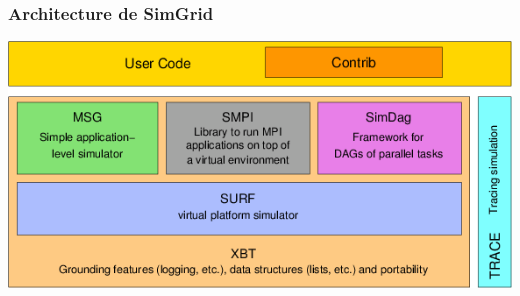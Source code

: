 \documentclass[10.5pt]{beamer}
\begin{document}
 \begin{frame}[plain]
   \centering
   \frametitle{Architecture de SimGrid}
   \centering
   \includegraphics[scale=0.5]{Pictures/png/SimGrid}
   \end{frame}
\end{document}
